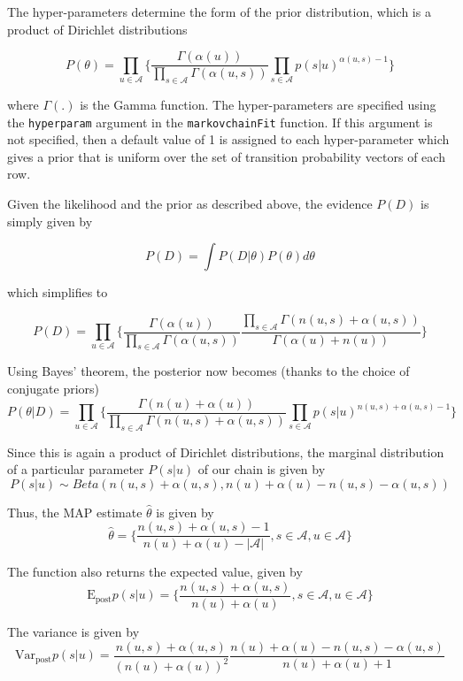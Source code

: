 \documentclass[
  nojss]{jss}
\begin{document}
The hyper-parameters determine the form of the prior distribution, which is a product of Dirichlet distributions

\[P(\theta) = \prod_{u \in \mathcal{A}} \Big\{ \frac{\Gamma(\alpha(u))}{\prod_{s \in \mathcal{A}} \Gamma(\alpha(u, s))} \prod_{s \in \mathcal{A}} p(s|u)^{\alpha(u, s) - 1} \Big\}\]

where \(\Gamma(.)\) is the Gamma function. The hyper-parameters are specified using the \texttt{hyperparam} argument in the \texttt{markovchainFit} function. If this argument is not specified, then a default value of 1 is assigned to each hyper-parameter which gives a prior that is uniform over the set of transition probability vectors of each row.

Given the likelihood and the prior as described above, the evidence \(P(D)\) is simply given by

\[P(D) = \int P(D|\theta) P(\theta) d\theta\]

which simplifies to

\[
P(D) = \prod_{u \in \mathcal{A}} \Big\{ \frac{\Gamma(\alpha(u))}{\prod_{s \in \mathcal{A}} \Gamma(\alpha(u, s))} \frac{\prod_{s \in \mathcal{A}} \Gamma(n(u, s) + \alpha(u, s))}{\Gamma(\alpha(u) + n(u))} \Big\}
\]

Using Bayes' theorem, the posterior now becomes (thanks to the choice of conjugate priors)
\[
P(\theta | D) = \prod_{u \in \mathcal{A}} \Big\{ \frac{\Gamma(n(u) + \alpha(u))}{\prod_{s \in \mathcal{A}} \Gamma(n(u, s) + \alpha(u, s))} \prod_{s \in \mathcal{A}} p(s|u)^{n(u, s) + \alpha(u, s) - 1} \Big\}
\]

Since this is again a product of Dirichlet distributions, the marginal distribution of a particular parameter \(P(s|u)\) of our chain is given by
\[
P(s|u) \sim Beta(n(u, s) + \alpha(u, s), n(u) + \alpha(u) - n(u, s) - \alpha(u, s))
\]

Thus, the MAP estimate \(\hat{\theta}\) is given by
\[
\hat{\theta} = \Big\{ \frac{n(u, s) + \alpha(u, s) - 1}{n(u) + \alpha(u) - |\mathcal{A}|}, s \in \mathcal{A}, u \in \mathcal{A} \Big\}
\]

The function also returns the expected value, given by
\[
\text{E}_{\text{post}} p(s|u) = \Big\{ \frac{n(u, s) + \alpha(u, s)}{n(u) + \alpha(u)}, s \in \mathcal{A}, u \in \mathcal{A} \Big\}
\]

The variance is given by
\[
\text{Var}_{\text{post}} p(s|u) = \frac{n(u, s) + \alpha(u, s)}{(n(u) + \alpha(u))^2} \frac{n(u) + \alpha(u) - n(u, s) - \alpha(u, s)}{n(u) + \alpha(u) + 1}
\]
\end{document}
